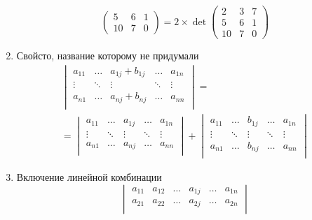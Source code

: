 \documentclass[class=article,a4paper,12pt,crop=false]{standalone}
\begin{document}
\begin{enumerate}
{\begin{equation}
{\begin{pmatrix}
          5 & 6 & 1 \\
          10 & 7 & 0
        \end{pmatrix}
      } = 2 \times \det{
        \begin{pmatrix}
          2 & 3 & 7 \\
          5 & 6 & 1 \\
          10 & 7 & 0
        \end{pmatrix}
      }
    \end{equation}
  }
  \item {
    Свойсто, название которому не придумали
      \begin{multline}
        \begin{vmatrix}
          a_{11} & \dots & a_{1j} + b_{1j} & \dots & a_{1n} \\
          \vdots & \ddots & \vdots & \ddots & \vdots \\
          a_{n1} & \dots & a_{nj} + b_{nj} & \dots & a_{nn} \\
        \end{vmatrix}
      = \\ = %
        \begin{vmatrix}
          a_{11} & \dots & a_{1j} & \dots & a_{1n} \\
          \vdots & \ddots & \vdots & \ddots & \vdots \\
          a_{n1} & \dots & a_{nj} & \dots & a_{nn} \\
        \end{vmatrix}
       +
        \begin{vmatrix}
          a_{11} & \dots & b_{1j} & \dots & a_{1n} \\
          \vdots & \ddots & \vdots & \ddots & \vdots \\
          a_{n1} & \dots & b_{nj} & \dots & a_{nn} \\
        \end{vmatrix}
      \end{multline}
  }
  \item {
    Включение линейной комбинации
    \begin{equation}
      \begin{vmatrix}
        a_{11} & a_{12} & \dots & a_{1j} & \dots & a_{1n} \\
        a_{21} & a_{22} & \dots & a_{2j} & \dots & a_{2n} \\

\end{vmatrix}
\end{equation}}
\end{enumerate}
\end{document}
